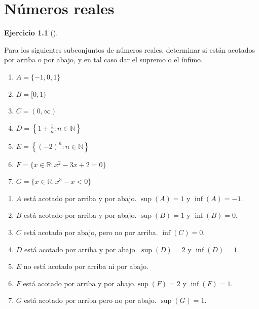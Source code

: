 \documentclass[
  a4paper,
]{scrreport}
\providecommand{\tightlist}{%
  \setlength{\itemsep}{0pt}\setlength{\parskip}{0pt}}\usepackage{longtable,booktabs,array}
\theoremstyle{definition}
\newtheorem{exercise}{Ejercicio}[chapter]
\theoremstyle{remark}
\begin{document}

\hypertarget{nuxfameros-reales}{%
\chapter{Números reales}\label{nuxfameros-reales}}

\leavevmode{}%
\begin{exercise}[]\label{exr-supremos-infimos-reales}

Para los siguientes subconjuntos de números reales, determinar si están
acotados por arriba o por abajo, y en tal caso dar el supremo o el
ínfimo.

\begin{enumerate}
\def\labelenumi{\alph{enumi}.}
\tightlist
\item
  \(A = \{-1,0,1\}\)
\item
  \(B= [0,1)\)
\item
  \(C= (0,\infty)\)
\item
  \(D= \left\{1+\frac{1}{n}:n\in\mathbb{N}\right\}\)
\item
  \(E= \left\{(-2)^n:n\in\mathbb{N}\right\}\)
\item
  \(F= \{x\in\mathbb{R}:x^2-3x+2=0\}\)
\item
  \(G= \{x\in\mathbb{R}:x^3-x<0\}\)
\end{enumerate}

\end{exercise}

\begin{tcolorbox}[enhanced jigsaw, coltitle=black, left=2mm, opacityback=0, colback=white, opacitybacktitle=0.6, breakable, colbacktitle=quarto-callout-tip-color!10!white, leftrule=.75mm, toptitle=1mm, arc=.35mm, bottomtitle=1mm, rightrule=.15mm, titlerule=0mm, title=\textcolor{quarto-callout-tip-color}{\faLightbulb}\hspace{0.5em}{Solución}, colframe=quarto-callout-tip-color-frame, toprule=.15mm, bottomrule=.15mm]

\begin{enumerate}
\def\labelenumi{\alph{enumi}.}
\item
  \(A\) está acotado por arriba y por abajo. \(\sup(A)=1\) y
  \(\inf(A)=-1\).
\item
  \(B\) está acotado por arriba y por abajo. \(\sup(B)=1\) y
  \(\inf(B)=0\).
\item
  \(C\) está acotado por abajo, pero no por arriba. \(\inf(C)=0\).
\item
  \(D\) está acotado por arriba y por abajo. \(\sup(D)=2\) y
  \(\inf(D)=1\).
\item
  \(E\) no está acotado por arriba ni por abajo.
\item
  \(F\) está acotado por arriba y por abajo.\(\sup(F)=2\) y
  \(\inf(F)=1\).
\item
  \(G\) está acotado por arriba pero no por abajo. \(\sup(G)=1\).
\end{enumerate}

\end{tcolorbox}
\end{document}
